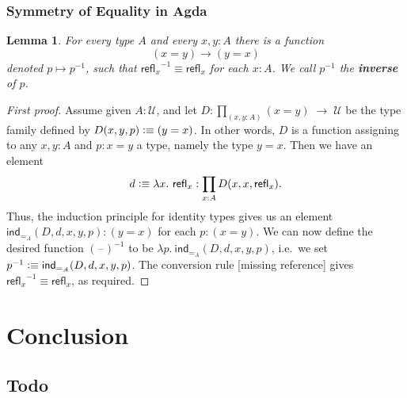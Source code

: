 \documentclass[9pt]{beamer}
\newtheorem{lem}{Lemma}
\newtheorem{proof}%
\newcommand{\jdeq}{\equiv}      %
\newcommand{\refl}[1]{\ensuremath{\mathsf{refl}_{#1}}\xspace}
\newcommand{\define}[1]{\textbf{#1}}
\newcommand{\defeq}{\vcentcolon\equiv}  %
\newcommand{\ind}[1]{\mathsf{ind}_{#1}}
\newcommand{\indid}[1]{\ind{=_{#1}}} %
\newcommand{\blank}{\mathord{\hspace{1pt}\text{--}\hspace{1pt}}}
\newcommand{\opp}[1]{\mathord{{#1}^{-1}}}
\newcommand{\UU}{\ensuremath{\mathcal{U}}\xspace}
\let\type\UU
\begin{document}
\begin{frame}
\frametitle{ Symmetry of Equality in Agda}  

% 

\end{frame}

\begin{frame}
\begin{lem}\label{lem:opp}
  For every type $A$ and every $x,y:A$ there is a function
  \begin{equation*}
    (x= y)\to(y= x)
  \end{equation*}
  denoted $p\mapsto \opp{p}$, such that $\opp{\refl{x}}\jdeq\refl{x}$ for each $x:A$.
  We call $\opp{p}$ the \define{inverse} of $p$.
\end{lem}
\begin{proof}[First proof]
  Assume given $A:\UU$, and
  let $D:{\textstyle\prod_{(x,y:A)}}(x= y) \; \to \; \type$ be the type family defined by $D(x,y,p)\defeq (y= x)$.
  In other words, $D$ is a function assigning to any $x,y:A$ and $p:x=y$ a type, namely the type $y=x$.
  Then we have an element
  \begin{equation*}
    d\defeq \lambda x.\ \refl{x}:\prod_{x:A} D(x,x,\refl{x}).
  \end{equation*}
  Thus, the induction principle for identity types gives us an element
  $\indid{A}(D,d,x,y,p): (y= x)$
  for each $p:(x= y)$.
  We can now define the desired function $\opp{(\blank)}$ to be 
  $\lambda p.\ \indid{A}(D,d,x,y,p)$, 
  i.e.\ we set 
  $\opp{p} \defeq \indid{A}(D,d,x,y,p)$.
  The conversion rule [missing reference] 
  gives $\opp{\refl{x}}\jdeq \refl{x}$, as required.
\end{proof}
\end{frame}


\section{Conclusion}

\subsection{Todo}
\end{document}
